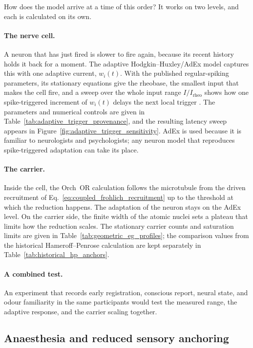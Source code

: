 How does the model arrive at a time of this order? It works on two levels, and each
is calculated on its own.

\paragraph{The nerve cell.}
A neuron that has just fired is slower to fire again, because its recent history holds
it back for a moment. The adaptive Hodgkin--Huxley/AdEx model captures this with one
adaptive current, $w_i(t)$. With the published regular-spiking parameters, its
stationary equations give the rheobase, the smallest input that makes the cell fire,
and a sweep over the whole input range $I/I_{\mathrm{rheo}}$ shows how one
spike-triggered increment of $w_i(t)$ delays the next local trigger
\citep{brettegerstner2005}. The parameters and numerical controls are given in
Table~\ref{tab:adaptive_trigger_provenance}, and the resulting latency sweep appears
in Figure~\ref{fig:adaptive_trigger_sensitivity}. AdEx is used because it is familiar
to neurologists and psychologists; any neuron model that reproduces spike-triggered
adaptation can take its place.

\paragraph{The carrier.}
Inside the cell, the Orch~OR calculation follows the microtubule from the driven
recruitment of Eq.~\eqref{eq:coupled_frohlich_recruitment} up to the threshold at
which the reduction happens. The adaptation of the neuron stays on the AdEx level. On
the carrier side, the finite width of the atomic nuclei sets a plateau that limits how
the reduction scales. The stationary carrier counts and saturation limits are given in
Table~\ref{tab:geometric_eg_profiles}; the comparison values from the historical
Hameroff--Penrose calculation are kept separately in
Table~\ref{tab:historical_hp_anchors}.

\paragraph{A combined test.}
An experiment that records early registration, conscious report, neural state, and
odour familiarity in the same participants would test the measured range, the
adaptive response, and the carrier scaling together.

\subsection{Anaesthesia and reduced sensory anchoring}

